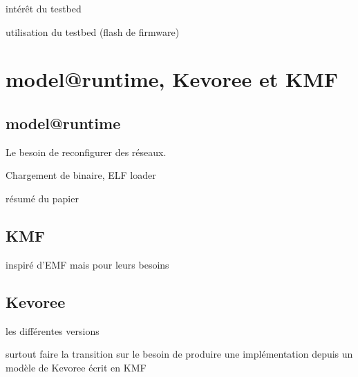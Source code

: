 intérêt du testbed

utilisation du testbed (flash de firmware)

\section{model@runtime, Kevoree et KMF}

\subsection{model@runtime}

Le besoin de reconfigurer des réseaux.

Chargement de binaire, ELF loader

résumé du papier

\subsection{KMF}

inspiré d'EMF mais pour leurs besoins

\subsection{Kevoree}

les différentes versions

surtout faire la transition sur le besoin de produire une implémentation depuis un modèle de Kevoree écrit en KMF